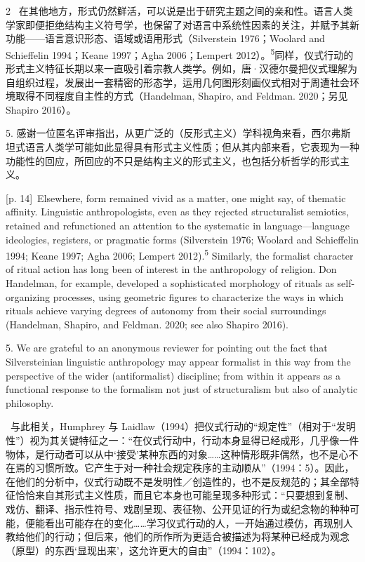 \documentclass[10pt,a4paper]{article}
\begin{document}
\begin{paracol}{2}
\switchcolumn*
{\scriptsize\color{gray} [p. 14]}\ 在其他地方，形式仍然鲜活，可以说是出于研究主题之间的亲和性。语言人类学家即便拒绝结构主义符号学，也保留了对语言中系统性因素的关注，并赋予其新功能——语言意识形态、语域或语用形式（Silverstein 1976；Woolard and Schieffelin 1994；Keane 1997；Agha 2006；Lempert 2012）。\textsuperscript{5}同样，仪式行动的形式主义特征长期以来一直吸引着宗教人类学。例如，唐·汉德尔曼把仪式理解为自组织过程，发展出一套精密的形态学，运用几何图形刻画仪式相对于周遭社会环境取得不同程度自主性的方式（Handelman, Shapiro, and Feldman. 2020；另见 Shapiro 2016）。\par{\small 5. 感谢一位匿名评审指出，从更广泛的（反形式主义）学科视角来看，西尔弗斯坦式语言人类学可能如此显得具有形式主义性质；但从其内部来看，它表现为一种功能性的回应，所回应的不只是结构主义的形式主义，也包括分析哲学的形式主义。\par}
\switchcolumn
{\scriptsize\color{gray} [p. 14]}\ Elsewhere, form remained vivid as a matter, one might say, of thematic affinity. Linguistic anthropologists, even as they rejected structuralist semiotics, retained and refunctioned an attention to the systematic in language—language ideologies, registers, or pragmatic forms (Silverstein 1976; Woolard and Schieffelin 1994; Keane 1997; Agha 2006; Lempert 2012).\textsuperscript{5} Similarly, the formalist character of ritual action has long been of interest in the anthropology of religion. Don Handelman, for example, developed a sophisticated morphology of rituals as self-organizing processes, using geometric figures to characterize the ways in which rituals achieve varying degrees of autonomy from their social surroundings (Handelman, Shapiro, and Feldman. 2020; see also Shapiro 2016).\par{\small 5. We are grateful to an anonymous reviewer for pointing out the fact that Silversteinian linguistic anthropology may appear formalist in this way from the perspective of the wider (antiformalist) discipline; from within it appears as a functional response to the formalism not just of structuralism but also of analytic philosophy.\par}
\switchcolumn*
{\scriptsize\color{gray} [p. 14]}\ 与此相关，Humphrey 与 Laidlaw（1994）把仪式行动的“规定性”（相对于“发明性”）视为其关键特征之一：“在仪式行动中，行动本身显得已经成形，几乎像一件物体，是行动者可以从中‘接受’某种东西的对象……这种情形既非偶然，也不是心不在焉的习惯所致。它产生于对一种社会规定秩序的主动顺从”（1994：5）。因此，在他们的分析中，仪式行动既不是发明性／创造性的，也不是反规范的；其全部特征恰恰来自其形式主义性质，而且它本身也可能呈现多种形式：“只要想到复制、戏仿、翻译、指示性符号、戏剧呈现、表征物、公开见证的行为或纪念物的种种可能，便能看出可能存在的变化……学习仪式行动的人，一开始通过模仿，再现别人教给他们的行动；但后来，他们的所作所为更适合被描述为将某种已经成为观念（原型）的东西‘显现出来’，这允许更大的自由”（1994：102）。\par

\end{paracol}
\end{document}
